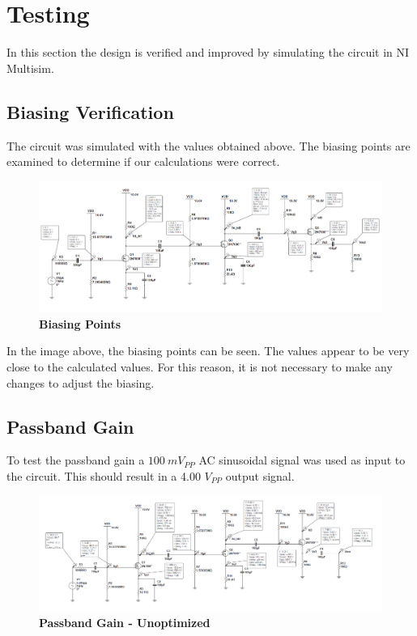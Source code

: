 \documentclass{article}
\begin{document}
\section{Testing}
In this section the design is verified and improved by simulating the circuit in NI Multisim.
\subsection{Biasing Verification}
The circuit was simulated with the values obtained above. The biasing points are examined to determine if our calculations were correct.
    \begin{figure}[H]
        \centerline{\includegraphics[width=\textwidth]{biasing_unopt_img}}
        \caption{\textbf{Biasing Points}}
	\end{figure}
In the image above, the biasing points can be seen. The values appear to be very close to the calculated values. For this reason, it is not necessary to make any changes to adjust the biasing.
\subsection{Passband Gain}
To test the passband gain a $100\ mV_{PP}$ AC sinusoidal signal was used as input to the circuit. This should result in a 4.00 $V_{PP}$ output signal. 
    \begin{figure}[H]
        \centerline{\includegraphics[width=\textwidth]{pass_band_gain_img}}
        \caption{\textbf{Passband Gain - Unoptimized}}
	\end{figure}
\end{document}
